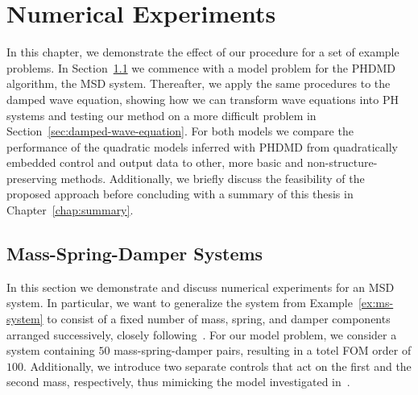 \chapter{Numerical Experiments}\label{chap:numerical-experiments}

In this chapter, we demonstrate the effect of our procedure for a set of example problems.
In Section~\ref{sec:msd-systems} we commence with a model problem for the \ac{PHDMD} algorithm, the \ac{MSD} system.
Thereafter, we apply the same procedures to the damped wave equation, showing how we can transform wave equations into \ac{PH} systems and testing our method on a more difficult problem in Section~\ref{sec:damped-wave-equation}.
For both models we compare the performance of the quadratic models inferred with \ac{PHDMD} from quadratically embedded control and output data to other, more basic and non-structure-preserving methods.
Additionally, we briefly discuss the feasibility of the proposed approach before concluding with a summary of this thesis in Chapter~\ref{chap:summary}.

\section{Mass-Spring-Damper Systems}\label{sec:msd-systems}

In this section we demonstrate and discuss numerical experiments for an \ac{MSD} system.
In particular, we want to generalize the system from Example~\ref{ex:ms-system} to consist of a fixed number of mass, spring, and damper components arranged successively, closely following~\cite{Gugercin2012, Morandin2023}.
For our model problem, we consider a system containing $50$ mass-spring-damper pairs, resulting in a totel \ac{FOM} order of $100$.
Additionally, we introduce two separate controls that act on the first and the second mass, respectively, thus mimicking the model investigated in~\cite[Section~4.3]{Morandin2023}.

